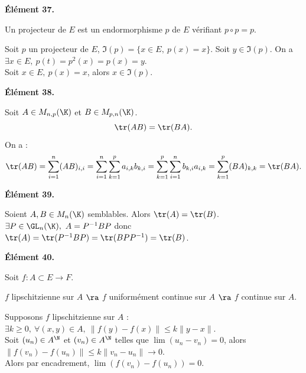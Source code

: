 \documentclass[11pt]{article}
\begin{document}
\vspace*{-0.4cm}

\begin{center}
    \bf{Élément 37.}
\end{center}

\begin{defi}{}{}
    Un projecteur de $E$ est un endormorphisme $p$ de $E$ vérifiant $p\circ p = p$.
\end{defi}

\vspace*{-0.4cm}

\begin{prop}{}{}
    Soit $p$ un projecteur de $E$, $\Im(p)=\{x\in E, ~ p(x)=x\}$.
    \tcblower
    \boxed{\subset} Soit $y\in\Im(p)$. On a $\exists x\in E, ~ p(t)=p^2(x)=p(x)=y$.\\
    \boxed{\supset} Soit $x\in E, ~ p(x)=x$, alors $x\in\Im(p)$.
\end{prop}

\vspace*{-0.4cm}

\begin{center}
    \bf{Élément 38.}
\end{center}

\begin{prop}{}{}
    Soit $A\in M_{n,p}(\K)$ et $B\in M_{p,n}(\K)$.
    \begin{equation*}
        \tr(AB)=\tr(BA).
    \end{equation*}
    \tcblower
    On a :
    \begin{equation*}
        \tr(AB)=\sum_{i=1}^n(AB)_{i,i}=\sum_{i=1}^n\sum_{k=1}^pa_{i,k}b_{k,i}=\sum_{k=1}^p\sum_{i=1}^nb_{k,i}a_{i,k}=\sum_{k=1}^p(BA)_{k,k}=\tr(BA).
    \end{equation*}
\end{prop}

\begin{center}
    \bf{Élément 39.}
\end{center}

\begin{prop}{}{}
    Soient $A,B\in M_n(\K)$ semblables. Alors $\tr(A)=\tr(B)$.
    \tcblower
    $\exists P \in \GL_n(\K), ~ A=P^{-1}BP$ donc $\tr(A)=\tr(P^{-1}BP)=\tr(BPP^{-1})=\tr(B)$.
\end{prop}

\begin{center}
    \bf{Élément 40.}
\end{center}

\begin{prop}{}{}
    Soit $f:A\subset E \to F$.
    \begin{center}
        $f$ lipschitzienne sur $A$ $\ra$ $f$ uniformément continue sur $A$ $\ra$ $f$ continue sur $A$.
    \end{center}
    \tcblower
    Supposons $f$ lipschitzienne sur $A$ : $\exists k \geq 0, ~ \forall (x,y)\in A, ~ \|f(y)-f(x)\|\leq k\|y-x\|$.\\
    Soit $(u_n)\in A^\N$ et $(v_n)\in A^\N$ telles que $\lim(u_n-v_n)=0$, alors $\|f(v_n)-f(u_n)\|\leq k\|v_n - u_n\| \to 0$.\\
    Alors par encadrement, $\lim(f(v_n)-f(u_n))=0$.
\end{prop}
\end{document}
